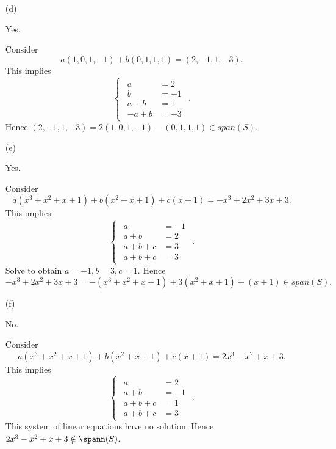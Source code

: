\begin{Exercise}
\begin{enumerate}[(a)]
		\item[(d)]
		\begin{answer}
			Yes.
		\end{answer}
		\begin{solution}
			Consider
			$$
			a(1,0,1,-1)+b(0,1,1,1) = (2,-1,1,-3).
			$$
			This implies
			$$
			\begin{cases}
			\begin{aligned}
			a &= 2 \\
			b &= -1 \\
			a+b &= 1 \\
			-a+b &= -3
			\end{aligned}
			\end{cases}.
			$$
			Hence $(2,-1,1,-3) = 2(1,0,1,-1)-(0,1,1,1) \in span(S)$.
		\end{solution}
		
		\item[(e)]
		\begin{answer}
			Yes.
		\end{answer}
		\begin{solution}
			Consider
			$$
			a(x^3+x^2+x+1)+b(x^2+x+1)+c(x+1) = -x^3+2x^2+3x+3.
			$$
			This implies
			$$
			\begin{cases}
			\begin{aligned}
			a &= -1 \\
			a+b &= 2 \\
			a+b+c &= 3 \\
			a+b+c &= 3
			\end{aligned}
			\end{cases}.
			$$
			Solve to obtain $a=-1,b=3,c=1$. Hence 
			$$
			-x^3+2x^2+3x+3=-(x^3+x^2+x+1)+3(x^2+x+1)+(x+1)\in span(S).
			$$
		\end{solution}
		
		\item[(f)]
		\begin{answer}
			No.
		\end{answer}
		\begin{solution}
			Consider
			$$
			a(x^3+x^2+x+1)+b(x^2+x+1)+c(x+1) = 2x^3-x^2+x+3.
			$$
			This implies
			$$
			\begin{cases}
			\begin{aligned}
			a &= 2 \\
			a+b &= -1 \\
			a+b+c &= 1 \\
			a+b+c &= 3
			\end{aligned}
			\end{cases}.
			$$
			This system of linear equations have no solution. Hence $2x^3-x^2+x+3\notin \spann(S)$.
		\end{solution}
		

\end{enumerate}
\end{Exercise}
